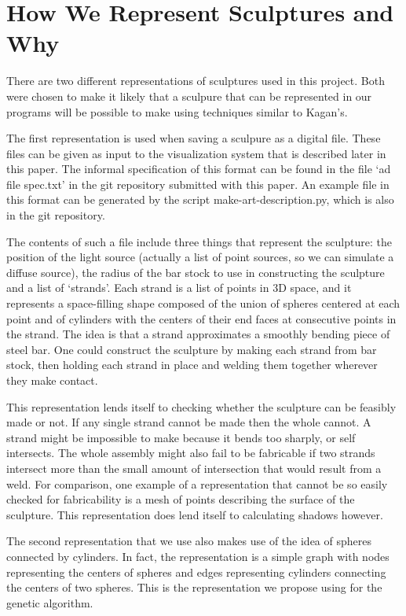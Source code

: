 \documentclass[10pt]{article}
\begin{document}
\section{How We Represent Sculptures and Why}
There are two different representations of sculptures used in this project. Both were chosen to make it likely that a sculpure that can be represented in our programs will be possible to make using techniques similar to Kagan's.

The first representation is used when saving a sculpure as a digital file. These files can be given as input to the visualization system that is described later in this paper. The informal specification of this format can be found in the file `ad file spec.txt' in the git repository submitted with this paper. An example file in this format can be generated by the script make-art-description.py, which is also in the git repository.

The contents of such a file include three things that represent the sculpture: the position of the light source (actually a list of point sources, so we can simulate a diffuse source), the radius of the bar stock to use in constructing the sculpture and a list of `strands'. Each strand is a list of points in 3D space, and it represents a space-filling shape composed of the union of spheres centered at each point and of cylinders with the centers of their end faces at consecutive points in the strand. The idea is that a strand approximates a smoothly bending piece of steel bar. One could construct the sculpture by making each strand from bar stock, then holding each strand in place and welding them together wherever they make contact.

This representation lends itself to checking whether the sculpture can be feasibly made or not. If any single strand cannot be made then the whole cannot. A strand might be impossible to make because it bends too sharply, or self intersects. The whole assembly might also fail to be fabricable if two strands intersect more than the small amount of intersection that would result from a weld. For comparison, one example of a representation that cannot be so easily checked for fabricability is a mesh of points describing the surface of the sculpture. This representation does lend itself to calculating shadows however.

The second representation that we use also makes use of the idea of spheres connected by cylinders. In fact, the representation is a simple graph with nodes representing the centers of spheres and edges representing cylinders connecting the centers of two spheres. This is the representation we propose using for the genetic algorithm.
\end{document}

